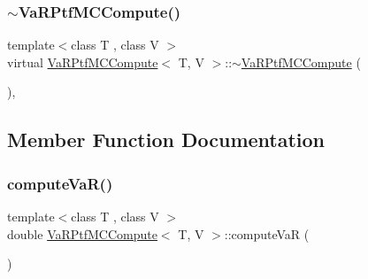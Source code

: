 \hypertarget{classVaRPtfMCCompute_a2172aaa668de0fff6c40b2a60ddd51d9}{}\label{classVaRPtfMCCompute_a2172aaa668de0fff6c40b2a60ddd51d9} 
\subsubsection{\texorpdfstring{$\sim$\+Va\+R\+Ptf\+M\+C\+Compute()}{~VaRPtfMCCompute()}}
{\footnotesize\ttfamily template$<$class T , class V $>$ \\
virtual \hyperlink{classVaRPtfMCCompute}{Va\+R\+Ptf\+M\+C\+Compute}$<$ T, V $>$\+::$\sim$\hyperlink{classVaRPtfMCCompute}{Va\+R\+Ptf\+M\+C\+Compute} (\begin{DoxyParamCaption}{ }\end{DoxyParamCaption})\hspace{0.3cm}{\ttfamily [inline]}, {\ttfamily [virtual]}}



\subsection{Member Function Documentation}
\hypertarget{classVaRPtfMCCompute_acd3f40602de413a00691acfb3b315982}{}\label{classVaRPtfMCCompute_acd3f40602de413a00691acfb3b315982} 
\subsubsection{\texorpdfstring{compute\+Va\+R()}{computeVaR()}}
{\footnotesize\ttfamily template$<$class T , class V $>$ \\
double \hyperlink{classVaRPtfMCCompute}{Va\+R\+Ptf\+M\+C\+Compute}$<$ T, V $>$\+::compute\+VaR (\begin{DoxyParamCaption}{ }\end{DoxyParamCaption})\hspace{0.3cm}{\ttfamily [inline]}}

\hypertarget{classVaRPtfMCCompute_a0ad1f3807e5d4df9a6f1212f754fa2cc}{}\label{classVaRPtfMCCompute_a0ad1f3807e5d4df9a6f1212f754fa2cc} 
